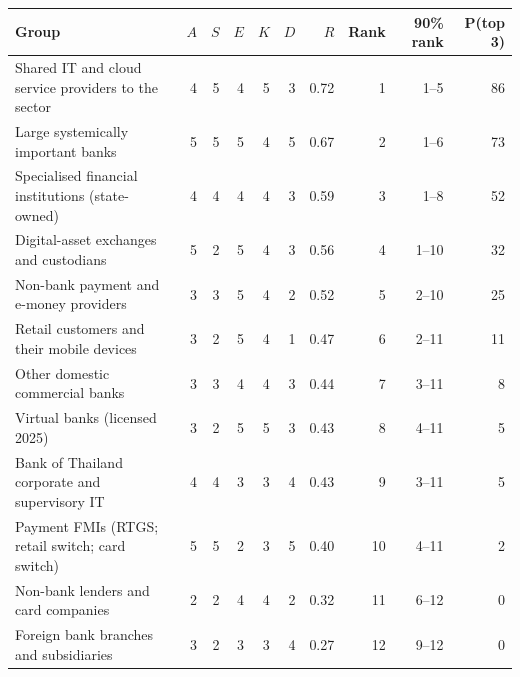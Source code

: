 \begin{tabular}{p{}rrrrrrrrr}
\toprule
Group & $A$ & $S$ & $E$ & $K$ & $D$ & $R$ & Rank & 90\% rank & P(top 3) \\
\midrule
Shared IT and cloud service providers to the sector & 4 & 5 & 4 & 5 & 3 & 0.72 & 1 & 1--5 & 86 \\
Large systemically important banks & 5 & 5 & 5 & 4 & 5 & 0.67 & 2 & 1--6 & 73 \\
Specialised financial institutions (state-owned) & 4 & 4 & 4 & 4 & 3 & 0.59 & 3 & 1--8 & 52 \\
Digital-asset exchanges and custodians & 5 & 2 & 5 & 4 & 3 & 0.56 & 4 & 1--10 & 32 \\
Non-bank payment and e-money providers & 3 & 3 & 5 & 4 & 2 & 0.52 & 5 & 2--10 & 25 \\
Retail customers and their mobile devices & 3 & 2 & 5 & 4 & 1 & 0.47 & 6 & 2--11 & 11 \\
Other domestic commercial banks & 3 & 3 & 4 & 4 & 3 & 0.44 & 7 & 3--11 & 8 \\
Virtual banks (licensed 2025) & 3 & 2 & 5 & 5 & 3 & 0.43 & 8 & 4--11 & 5 \\
Bank of Thailand corporate and supervisory IT & 4 & 4 & 3 & 3 & 4 & 0.43 & 9 & 3--11 & 5 \\
Payment FMIs (RTGS; retail switch; card switch) & 5 & 5 & 2 & 3 & 5 & 0.40 & 10 & 4--11 & 2 \\
Non-bank lenders and card companies & 2 & 2 & 4 & 4 & 2 & 0.32 & 11 & 6--12 & 0 \\
Foreign bank branches and subsidiaries & 3 & 2 & 3 & 3 & 4 & 0.27 & 12 & 9--12 & 0 \\
\bottomrule
\end{tabular}